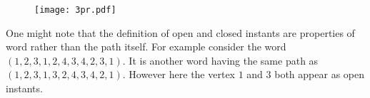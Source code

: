 \documentclass[12pt]{article}
\numberwithin{equation}{section}
\newtheorem{algorithm}{Algorithm}[section]
\numberwithin{equation}{section}
\theoremstyle{definition}
\renewcommand{\1}{\bf 1}
\begin{document}
\begin{figure}[H]
        \begin{center}
                \texttt{[image: 3pr.pdf]}
        ~ %
      \end{center}   
 \end{figure} 
\noindent
One might note that the definition of open and closed instants are properties of word rather than the path itself. For example consider the word $(1,2,3,1,2,4,3,4,2,3,1)$. It is another word having the same path as $(1,2,3,1,3,2,4,3,4,2,1)$. However here the vertex $1$ and $3$ both appear as open instants.
\end{document}

